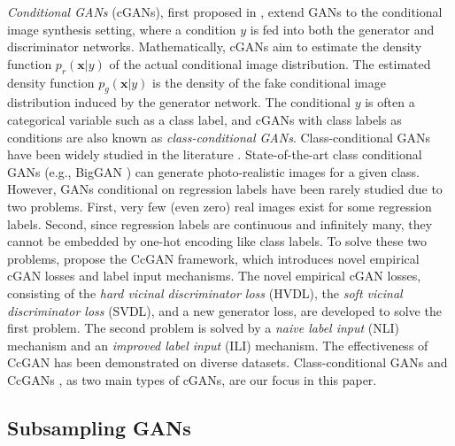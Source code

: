 \documentclass[final,12pt, 3p,times]{elsarticle}
\begin{document}
\textit{Conditional GANs} (cGANs), first proposed in \cite{mirza2014conditional}, extend GANs \cite{goodfellow2014generative} to the conditional image synthesis setting, where a condition $y$ is fed into both the generator and discriminator networks. Mathematically, cGANs aim to estimate the density function $p_r(\bm{x}|y)$ of the actual conditional image distribution. The estimated density function $p_g(\bm{x}|y)$ is the density of the fake conditional image distribution induced by the generator network. The conditional $y$ is often a categorical variable such as a class label, and cGANs with class labels as conditions are also known as \textit{class-conditional GANs}. Class-conditional GANs have been widely studied in the literature \cite{odena2017conditional, miyato2018cgans, brock2018large, zhang2019self}. State-of-the-art class conditional GANs (e.g., BigGAN \cite{brock2018large}) can generate photo-realistic images for a given class. However, GANs conditional on regression labels have been rarely studied due to two problems. First, very few (even zero) real images exist for some regression labels. Second, since regression labels are continuous and infinitely many, they cannot be embedded by one-hot encoding like class labels. To solve these two problems, \cite{ding2021ccgan, ding2020continuous} propose the CcGAN framework, which introduces novel empirical cGAN losses and label input mechanisms. The novel empirical cGAN losses, consisting of the \textit{hard vicinal discriminator loss} (HVDL), the \textit{soft vicinal discriminator loss} (SVDL), and a new generator loss, are developed to solve the first problem. The second problem is solved by a \textit{naive label input} (NLI) mechanism and an \textit{improved label input} (ILI) mechanism. The effectiveness of CcGAN has been demonstrated on diverse datasets. Class-conditional GANs \cite{odena2017conditional, miyato2018cgans, brock2018large, zhang2019self} and CcGANs \cite{ding2021ccgan, ding2020continuous}, as two main types of cGANs, are our focus in this paper.





\subsection{Subsampling GANs}\label{sec:related_DRE-F-SP}
\end{document}
